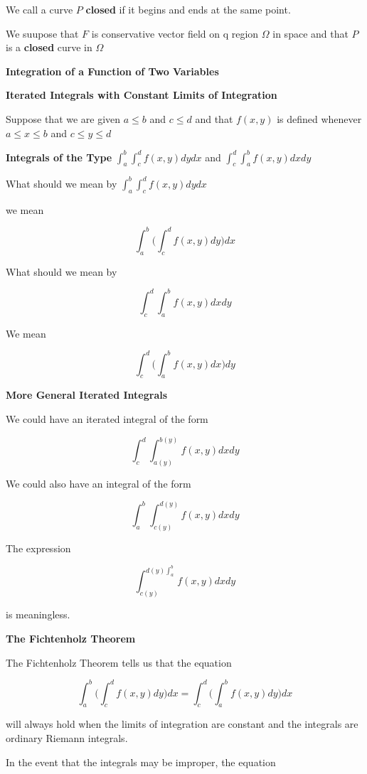 \vskip 1mm
We call a curve $P$ {\bf closed} if it begins and ends at the same point.

\vskip 1mm
We suupose that $F$ is conservative vector field on q region $\Omega$ in space and that $P$ is a {\bf closed} curve in $\Omega$

\filbreak
\vskip 1cm
{\bf Integration of a Function of Two Variables}

\vskip 1mm
{\bf Iterated Integrals with Constant Limits of Integration}

\vskip 1mm
Suppose that we are given $a\leq b$ and $c\leq d$ and that $f(x,y)$ is defined whenever $a\leq x\leq b$ and $c\leq y \leq d$

\filbreak
\vskip 1cm
{\bf Integrals of the Type} $\int_a^b\int_c^df(x,y)dydx$ and $\int_c^d\int_a^bf(x,y)dxdy$

\vskip 1mm
What should we mean by $\int_a^b\int_c^df(x,y)dydx$

we mean

$$\int_a^b\Biggl(\int_c^df(x,y)dy\Biggr)dx$$

What should we mean by

$$\int_c^d\int_a^bf(x,y)dxdy$$

We mean

$$\int_c^d\Biggl(\int_a^bf(x,y)dx\Biggr)dy$$

\filbreak
\vskip 1cm
{\bf More General Iterated Integrals}

\vskip 1mm
We could have an iterated integral of the form

$$\int_c^d\int_{a(y)}^{b(y)}f(x,y)dxdy$$

\vskip 1mm
We could also have an integral of the form

$$\int_a^b\int_{c(y)}^{d(y)}f(x,y)dxdy$$

The expression

$$\int_{c(y)}^{d(y)\int_a^b}f(x,y)dxdy$$

is meaningless.

\filbreak
\vskip 1cm
{\bf The Fichtenholz Theorem}

\vskip 1mm
The Fichtenholz Theorem tells us that the equation

$$\int_a^b\Biggl(\int_c^df(x,y)dy\Biggr)dx=\int_c^d\Biggl(\int_a^bf(x,y)dy\Biggr)dx$$

will always hold when the limits of integration are constant and the integrals are ordinary Riemann integrals.

\vskip 1mm
In the event that the integrals may be improper, the equation


